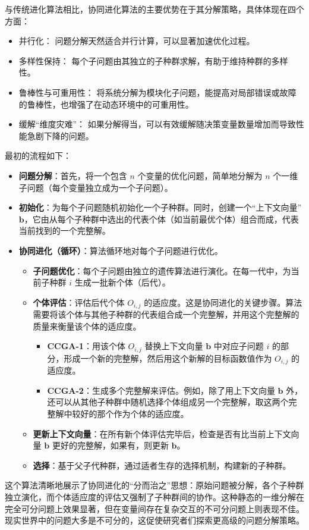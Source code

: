 与传统进化算法相比，协同进化算法的主要优势在于其分解策略，具体体现在四个方面：
\begin{itemize}
\item 并行化： 问题分解天然适合并行计算，可以显著加速优化过程。
\item 多样性保持： 每个子问题由其独立的子种群求解，有助于维持种群的多样性。
\item 鲁棒性与可重用性： 将系统分解为模块化子问题，能提高对局部错误或故障的鲁棒性，也增强了在动态环境中的可重用性。
\item 缓解“维度灾难”： 如果分解得当，可以有效缓解随决策变量数量增加而导致性能急剧下降的问题。
\end{itemize}
最初的流程如下：
\begin{itemize}
    \item \textbf{问题分解}：首先，将一个包含 $n$ 个变量的优化问题，简单地分解为 $n$ 个一维子问题（每个变量独立成为一个子问题）。
    \item \textbf{初始化}：为每个子问题随机初始化一个子种群。同时，创建一个“上下文向量” $\mathbf{b}$，它由从每个子种群中选出的代表个体（如当前最优个体）组合而成，代表当前找到的一个完整解。
    \item \textbf{协同进化（循环）}：算法循环地对每个子问题进行优化。
    \begin{itemize}
        \item \textbf{子问题优化}：每个子问题由独立的遗传算法进行演化。在每一代中，为当前子种群 $i$ 生成一批新个体（后代）。
        \item \textbf{个体评估}：评估后代个体 $O_{i,j}$ 的适应度。这是协同进化的关键步骤。算法需要将该个体与其他子种群的代表组合成一个完整解，并用这个完整解的质量来衡量该个体的适应度。
        \begin{itemize}
            \item \textbf{CCGA-1}：用该个体 $O_{i,j}$ 替换上下文向量 $\mathbf{b}$ 中对应子问题 $i$ 的部分，形成一个新的完整解，然后用这个新解的目标函数值作为 $O_{i,j}$ 的适应度。
            \item \textbf{CCGA-2}：生成多个完整解来评估。例如，除了用上下文向量 $\mathbf{b}$ 外，还可以从其他子种群中随机选择个体组成另一个完整解，取这两个完整解中较好的那个作为个体的适应度。
        \end{itemize}
        \item \textbf{更新上下文向量}：在所有新个体评估完毕后，检查是否有比当前上下文向量 $\mathbf{b}$ 更好的完整解，如果有，则更新 $\mathbf{b}$。
        \item \textbf{选择}：基于父子代种群，通过适者生存的选择机制，构建新的子种群。
    \end{itemize}
\end{itemize}
这个算法清晰地展示了协同进化的“分而治之”思想：原始问题被分解，各个子种群独立演化，而个体适应度的评估又强制了子种群间的协作。这种静态的一维分解在完全可分问题上效果显著，但在变量间存在复杂交互的不可分问题上则表现不佳。现实世界中的问题大多是不可分的，这促使研究者们探索更高级的问题分解策略。

